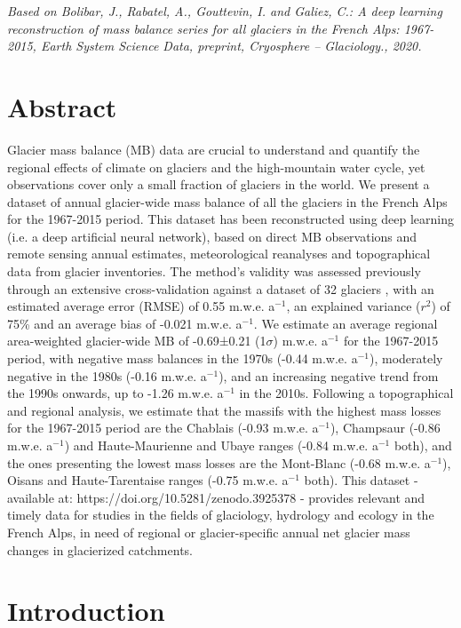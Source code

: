 \textit{Based on Bolibar, J., Rabatel, A., Gouttevin, I. and Galiez, C.: A deep learning reconstruction of mass balance series for all glaciers in the French Alps: 1967-2015, Earth System Science Data, preprint, Cryosphere – Glaciology., 2020.}


\section{Abstract}

Glacier mass balance (MB) data are crucial to understand and quantify the regional effects of climate on glaciers and the high-mountain water cycle, yet observations cover only a small fraction of glaciers in the world. We present a dataset of annual glacier-wide mass balance of all the glaciers in the French Alps for the 1967-2015 period. This dataset has been reconstructed using deep learning (i.e. a deep artificial neural network), based on direct MB observations and remote sensing annual estimates, meteorological reanalyses and topographical data from glacier inventories. The method's validity was assessed previously through an extensive cross-validation against a dataset of 32 glaciers , with an estimated average error (RMSE) of 0.55 m.w.e. a$^{-1}$,  an explained variance ($r^{2}$) of 75\% and an average bias of -0.021 m.w.e. a$^{-1}$. We estimate an average regional area-weighted glacier-wide MB of -0.69±0.21 (1$\sigma$) m.w.e. a$^{-1}$ for the 1967-2015 period, with negative mass balances in the 1970s (-0.44 m.w.e. a$^{-1}$), moderately negative in the 1980s (-0.16 m.w.e. a$^{-1}$), and an increasing negative trend from the 1990s onwards, up to -1.26 m.w.e. a$^{-1}$ in the 2010s. Following a topographical and regional analysis, we estimate that the massifs with the highest mass losses for the 1967-2015 period are the Chablais (-0.93 m.w.e. a$^{-1}$), Champsaur (-0.86 m.w.e. a$^{-1}$) and  Haute-Maurienne and Ubaye ranges (-0.84 m.w.e. a$^{-1}$ both), and the ones presenting the lowest mass losses are the Mont-Blanc (-0.68 m.w.e. a$^{-1}$), Oisans and Haute-Tarentaise ranges (-0.75 m.w.e. a$^{-1}$ both). This dataset - available at: https://doi.org/10.5281/zenodo.3925378
 \citep{bolibar_deep_2020} - provides relevant and timely data for studies in the fields of glaciology, hydrology and ecology in the French Alps, in need of regional or glacier-specific annual net glacier mass changes in glacierized catchments.
 
\section{Introduction}

